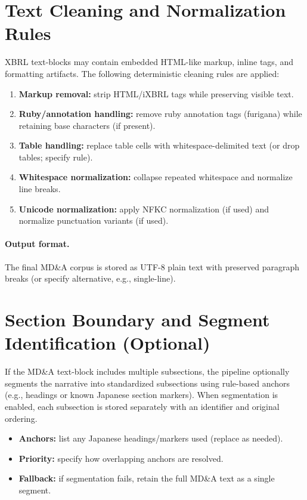 \section{Text Cleaning and Normalization Rules}
\label{appendix:mdna_cleaning}

XBRL text-blocks may contain embedded HTML-like markup, inline tags, and formatting artifacts. The following deterministic cleaning rules are applied:

\begin{enumerate}
  \item \textbf{Markup removal:} strip HTML/iXBRL tags while preserving visible text.
  \item \textbf{Ruby/annotation handling:} remove ruby annotation tags (furigana) while retaining base characters (if present).
  \item \textbf{Table handling:} replace table cells with whitespace-delimited text (or drop tables; specify rule).
  \item \textbf{Whitespace normalization:} collapse repeated whitespace and normalize line breaks.
  \item \textbf{Unicode normalization:} apply NFKC normalization (if used) and normalize punctuation variants (if used).
\end{enumerate}

\paragraph{Output format.}
The final MD\&A corpus is stored as UTF-8 plain text with preserved paragraph breaks (or specify alternative, e.g., single-line).

\section{Section Boundary and Segment Identification (Optional)}
\label{appendix:mdna_segmentation}

If the MD\&A text-block includes multiple subsections, the pipeline optionally segments the narrative into standardized subsections using rule-based anchors (e.g., headings or known Japanese section markers). When segmentation is enabled, each subsection is stored separately with an identifier and original ordering.

\begin{itemize}
  \item \textbf{Anchors:} list any Japanese headings/markers used (replace as needed).
  \item \textbf{Priority:} specify how overlapping anchors are resolved.
  \item \textbf{Fallback:} if segmentation fails, retain the full MD\&A text as a single segment.
\end{itemize}


